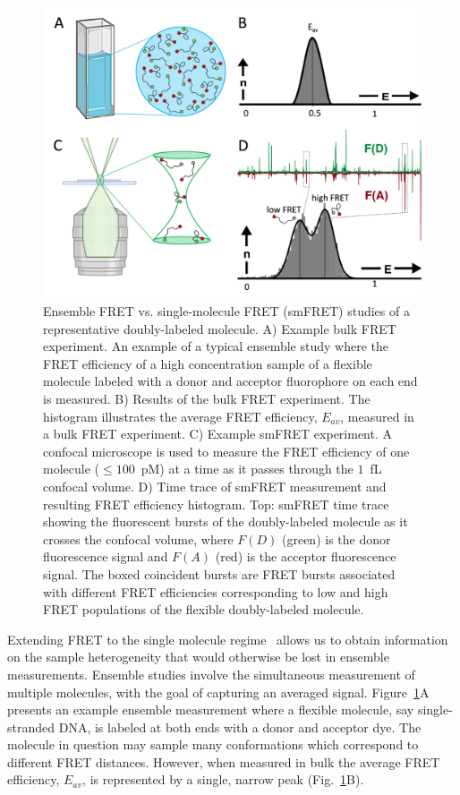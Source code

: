 \begin{figure}
    \centering
    \includegraphics[width=\textwidth]{chapters/figures/smFRET_vs_ensemble.jpg}
    \caption{\label{fig:smFRET_vs_ensemble} 
    Ensemble FRET vs. single-molecule FRET (\ac{smFRET}) studies of a representative doubly-labeled molecule.
    A) Example bulk FRET experiment. 
    An example of a typical ensemble study where the FRET efficiency of a high concentration sample of a flexible molecule labeled with a donor and acceptor fluorophore on each end is measured.
    B) Results of the bulk FRET experiment.
    The histogram illustrates the average FRET efficiency, $E_{av}$, measured in a bulk FRET experiment. 
    C) Example smFRET experiment.
    A confocal microscope is used to measure the FRET efficiency of one molecule ($\leq 100$~pM) at a time as it passes through the $1$~fL confocal volume.
    D) Time trace of smFRET measurement and resulting FRET efficiency histogram.
    Top: smFRET time trace showing the fluorescent bursts of the doubly-labeled molecule as it crosses the confocal volume, where $F(D)$ (green) is the donor fluorescence signal and $F(A)$ (red) is the acceptor fluorescence signal.
    The boxed coincident bursts are FRET bursts associated with different FRET efficiencies corresponding to low and high FRET populations of the flexible doubly-labeled molecule.
    }
\end{figure}

Extending FRET to the single molecule regime~\cite{deniz_PNAS_1999} allows us to obtain information on the sample heterogeneity that would otherwise be lost in ensemble measurements. 
Ensemble studies involve the simultaneous measurement of multiple molecules, with the goal of capturing an averaged signal.
Figure~\ref{fig:smFRET_vs_ensemble}A presents an example ensemble measurement where a flexible molecule, say single-stranded DNA, is labeled at both ends with a donor and acceptor dye.
The molecule in question may sample many conformations which correspond to different FRET distances.
However, when measured in bulk the average FRET efficiency, $E_{av}$, is represented by a single, narrow peak (Fig.~\ref{fig:smFRET_vs_ensemble}B).

